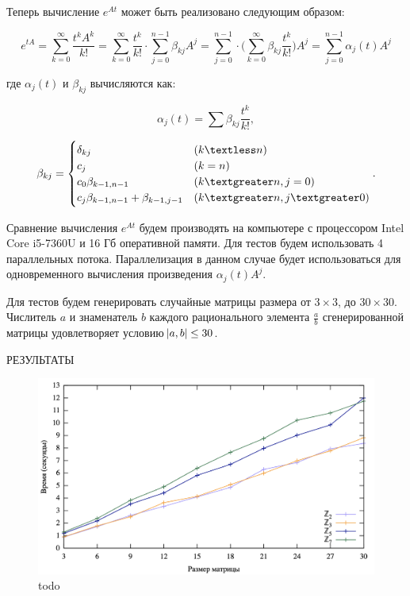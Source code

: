 \documentclass[master, och, diploma, times]{sty/SCWorks}
\theoremstyle{plain}
\theoremstyle{definition}
\begin{document}
Теперь вычисление $e^{At}$ может быть реализовано следующим образом:


\begin{equation}
e^{tA}=\sum\limits_{k=0}^{\infty} \frac{t^kA^k}{k!}=\sum\limits_{k=0}^{\infty} \frac{t^k}{k!} \cdot \sum\limits_{j=0}^{n-1} \beta_{kj} A^j = \sum\limits_{j=0}^{n-1} \cdot \bigg(\sum\limits_{k=0}^{\infty} \beta_{kj} \frac{t^k}{k!} \bigg) A^j = \sum\limits_{j=0}^{n-1} \alpha_{j}(t)A^j
\end{equation}

\noindent где $\alpha_{j}(t)$ и $\beta_{kj}$ вычисляются как:

\begin{equation}
\alpha_{j}(t)=\sum \beta_{kj} \frac{t^k}{k!},
\end{equation}

\begin{equation}
\beta_{kj} = \begin{cases} 
\delta_{kj} & (k \textless n) \\
c_j & (k = n) \\
c_0 \beta_{k-1,n-1} & (k \textgreater n, j=0) \\
c_j \beta_{k-1,n-1}+\beta_{k-1,j-1} & (k \textgreater n, j \textgreater 0)
\end{cases}.
\end{equation}


Сравнение вычисления $e^{At}$ будем производять на компьютере с процессором Intel Core i5-7360U и 16 Гб оперативной памяти. Для тестов будем использовать 4 параллельных потока. Параллелизация в данном случае будет использоваться для одновременного вычисления произведения $\alpha_{j}(t)A^j$.

Для тестов будем генерировать случайные матрицы размера от $3 \times 3$, до $30 \times 30$. Числитель $a$ и знаменатель $b$ каждого рационального элемента $\frac{a}{b}$ сгенерированной матрицы удовлетворяет условию $\abs{a,b} \leq 30$. 

РЕЗУЛЬТАТЫ

\begin{figure}[H]
\centerline{\includegraphics[width=0.85\linewidth]{../gnuplot/exp/plot/plot.png}}
\caption{todo}
\label{img:exp:plot}
\end{figure}
\end{document}
